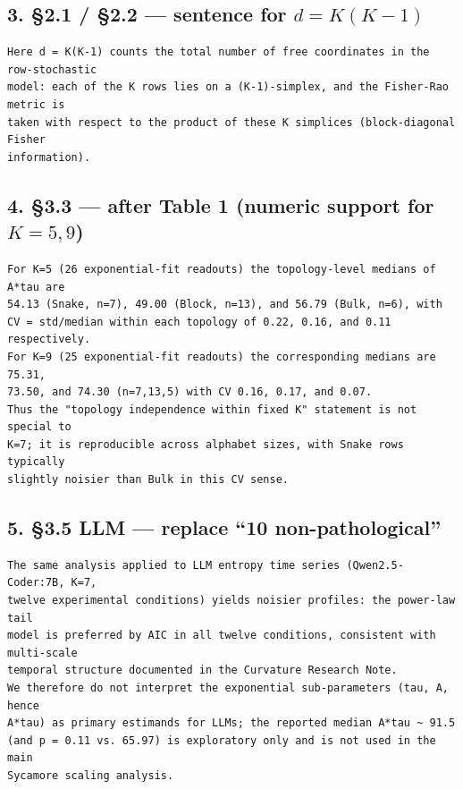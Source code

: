 \documentclass[11pt]{article}
\begin{document}
\subsection*{3. \S2.1 / \S2.2 --- sentence for $d=K(K{-}1)$}

\begin{verbatim}
Here d = K(K-1) counts the total number of free coordinates in the row-stochastic
model: each of the K rows lies on a (K-1)-simplex, and the Fisher-Rao metric is
taken with respect to the product of these K simplices (block-diagonal Fisher
information).
\end{verbatim}

\subsection*{4. \S3.3 --- after Table 1 (numeric support for $K{=}5,9$)}

\begin{verbatim}
For K=5 (26 exponential-fit readouts) the topology-level medians of A*tau are
54.13 (Snake, n=7), 49.00 (Block, n=13), and 56.79 (Bulk, n=6), with
CV = std/median within each topology of 0.22, 0.16, and 0.11 respectively.
For K=9 (25 exponential-fit readouts) the corresponding medians are 75.31,
73.50, and 74.30 (n=7,13,5) with CV 0.16, 0.17, and 0.07.
Thus the "topology independence within fixed K" statement is not special to
K=7; it is reproducible across alphabet sizes, with Snake rows typically
slightly noisier than Bulk in this CV sense.
\end{verbatim}

\subsection*{5. \S3.5 LLM --- replace ``10 non-pathological''}

\begin{verbatim}
The same analysis applied to LLM entropy time series (Qwen2.5-Coder:7B, K=7,
twelve experimental conditions) yields noisier profiles: the power-law tail
model is preferred by AIC in all twelve conditions, consistent with multi-scale
temporal structure documented in the Curvature Research Note.
We therefore do not interpret the exponential sub-parameters (tau, A, hence
A*tau) as primary estimands for LLMs; the reported median A*tau ~ 91.5
(and p = 0.11 vs. 65.97) is exploratory only and is not used in the main
Sycamore scaling analysis.
\end{verbatim}
\end{document}
